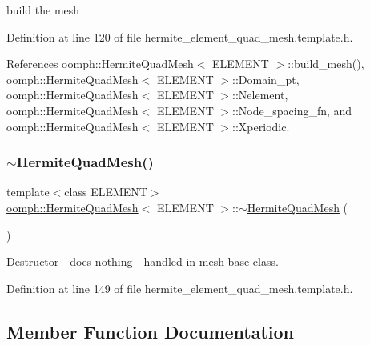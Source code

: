 build the mesh 

Definition at line 120 of file hermite\+\_\+element\+\_\+quad\+\_\+mesh.\+template.\+h.



References oomph\+::\+Hermite\+Quad\+Mesh$<$ E\+L\+E\+M\+E\+N\+T $>$\+::build\+\_\+mesh(), oomph\+::\+Hermite\+Quad\+Mesh$<$ E\+L\+E\+M\+E\+N\+T $>$\+::\+Domain\+\_\+pt, oomph\+::\+Hermite\+Quad\+Mesh$<$ E\+L\+E\+M\+E\+N\+T $>$\+::\+Nelement, oomph\+::\+Hermite\+Quad\+Mesh$<$ E\+L\+E\+M\+E\+N\+T $>$\+::\+Node\+\_\+spacing\+\_\+fn, and oomph\+::\+Hermite\+Quad\+Mesh$<$ E\+L\+E\+M\+E\+N\+T $>$\+::\+Xperiodic.

\mbox{\label{classoomph_1_1HermiteQuadMesh_a81f14d729df268911cd3943efc125492}} 
\subsubsection{\texorpdfstring{$\sim$\+Hermite\+Quad\+Mesh()}{~HermiteQuadMesh()}}
{\footnotesize\ttfamily template$<$class E\+L\+E\+M\+E\+NT$>$ \\
\hyperlink{classoomph_1_1HermiteQuadMesh}{oomph\+::\+Hermite\+Quad\+Mesh}$<$ E\+L\+E\+M\+E\+NT $>$\+::$\sim$\hyperlink{classoomph_1_1HermiteQuadMesh}{Hermite\+Quad\+Mesh} (\begin{DoxyParamCaption}{ }\end{DoxyParamCaption})\hspace{0.3cm}{\ttfamily [inline]}}



Destructor -\/ does nothing -\/ handled in mesh base class. 



Definition at line 149 of file hermite\+\_\+element\+\_\+quad\+\_\+mesh.\+template.\+h.



\subsection{Member Function Documentation}
\mbox{\label{classoomph_1_1HermiteQuadMesh_af72fd9b700fdee643ce6d6259c0e8e6f}} 
